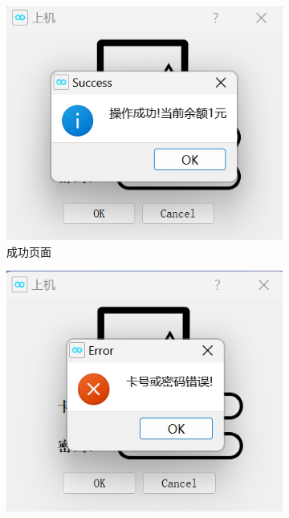 \documentclass{article}
\begin{document}
    \begin{figure}[htbp]
        \centering
        \begin{subfigure}{0.24\linewidth}
            \centering
            \includegraphics[width=\linewidth]{figure/logon_success.png}
            \caption{成功页面}
            \label{logon_success}
        \end{subfigure}
        \centering
        \begin{subfigure}{0.24\linewidth}
            \centering
            \includegraphics[width=\linewidth]{figure/logon_password_error.png}

\end{subfigure}
\end{figure}
\end{document}
